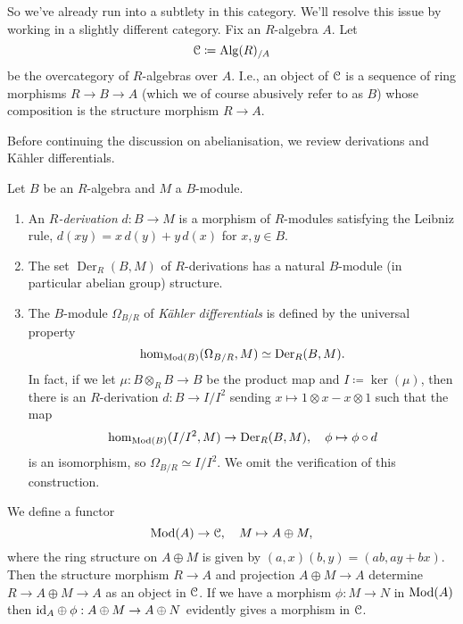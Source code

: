 \begin{nothing}
  So we've already run into a subtlety in this category. We'll resolve
  this issue by working in a slightly different category. Fix an
  $R$-algebra $A$. Let
  \[
  \mathcal{C} \coloneqq \mathrm{Alg}(R)_{/A}
  \]
  be the overcategory of $R$-algebras over $A$. I.e., an object of
  $\mathcal{C}$ is a sequence of ring morphisms $R \to B \to A$ (which we of
  course abusively refer to as $B$) whose composition is the structure
  morphism $R \to A$.
\end{nothing}

Before continuing the discussion on abelianisation, we review
derivations and K\"ahler differentials.

\newcommand{\Der}{\operatorname{Der}}

\begin{definitions}
  \label{derivations}
  Let $B$ be an $R$-algebra and $M$ a $B$-module.
  \begin{enumerate}[leftmargin=*]
  \item An \emph{$R$-derivation} $d : B \to M$ is a morphism of
    $R$-modules satisfying the Leibniz rule, $d(xy) = x\,d(y) +
    y\,d(x)$ for $x,y \in B$.
  \item The set $\Der_R(B,M)$ of $R$-derivations has a natural
    $B$-module (in particular abelian group) structure.
  \item \label{kahdiff} The $B$-module $\Omega_{B/R}$ of
    \emph{K\"ahler differentials} is defined by the universal property
    \[
    \hom_{\Mod(B)}(\Omega_{B/R}, M) \simeq \Der_R(B,M).
    \]
    In fact, if we let $\mu : B \otimes_R B \to B$ be the product map
    and $I \coloneqq \ker(\mu)$, then there is an $R$-derivation $d :
    B \to I/I^2$ sending $x \mapsto 1 \otimes x - x \otimes 1$ such
    that the map
    \[
    \hom_{\Mod(B)}(I/I^2, M) \to \Der_R(B,M), \quad \phi \mapsto \phi
    \circ d
    \]
    is an isomorphism, so $\Omega_{B/R} \simeq I/I^2$. We omit the
    verification of this construction.
  \end{enumerate}
\end{definitions}

\begin{nothing}
  \label{square-zero}
  We define a functor
  \[
  \mathrm{Mod}(A) \to \mathcal{C}, \quad M \mapsto A \oplus M,
  \]
  where the ring structure on $A \oplus M$ is given by $(a,x)(b,y) =
  (ab,ay+bx)$. Then the structure morphism $R \to A$ and projection $A
  \oplus M \to A$ determine $R \to A \oplus M \to A$ as an object in
  $\mathcal{C}$. If we have a morphism $\phi : M \to N$ in $\mathrm{Mod}(A)$ then
  $\mathrm{id}_A \oplus \phi : A \oplus M \to A \oplus N$ evidently gives a
  morphism in $\mathcal{C}$.
\end{nothing}

